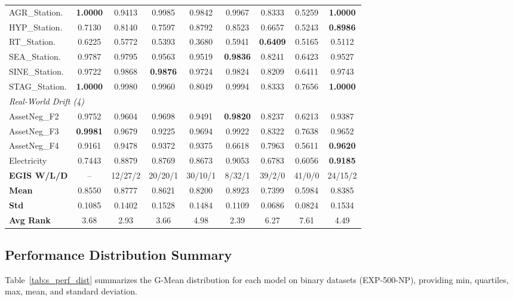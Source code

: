 \documentclass[lettersize,10pt]{article}
\begin{document}
\begin{longtable}{lcccccccc}
\midrule
AGR\_Station. & \textbf{1.0000} & 0.9413 & 0.9985 & 0.9842 & 0.9967 & 0.8333 & 0.5259 & \textbf{1.0000} \\
HYP\_Station. & 0.7130 & 0.8140 & 0.7597 & 0.8792 & 0.8523 & 0.6657 & 0.5243 & \textbf{0.8986} \\
RT\_Station. & 0.6225 & 0.5772 & 0.5393 & 0.3680 & 0.5941 & \textbf{0.6409} & 0.5165 & 0.5112 \\
SEA\_Station. & 0.9787 & 0.9795 & 0.9563 & 0.9519 & \textbf{0.9836} & 0.8241 & 0.6423 & 0.9527 \\
SINE\_Station. & 0.9722 & 0.9868 & \textbf{0.9876} & 0.9724 & 0.9824 & 0.8209 & 0.6411 & 0.9743 \\
STAG\_Station. & \textbf{1.0000} & 0.9980 & 0.9960 & 0.8049 & 0.9994 & 0.8333 & 0.7656 & \textbf{1.0000} \\
\midrule \multicolumn{9}{l}{\textit{Real-World Drift (4)}}\\
\midrule
AssetNeg\_F2 & 0.9752 & 0.9604 & 0.9698 & 0.9491 & \textbf{0.9820} & 0.8237 & 0.6213 & 0.9387 \\
AssetNeg\_F3 & \textbf{0.9981} & 0.9679 & 0.9225 & 0.9694 & 0.9922 & 0.8322 & 0.7638 & 0.9652 \\
AssetNeg\_F4 & 0.9161 & 0.9478 & 0.9372 & 0.9375 & 0.6618 & 0.7963 & 0.5611 & \textbf{0.9620} \\
Electricity & 0.7443 & 0.8879 & 0.8769 & 0.8673 & 0.9053 & 0.6783 & 0.6056 & \textbf{0.9185} \\
\midrule
\textbf{EGIS W/L/D} & -- & 12/27/2 & 20/20/1 & 30/10/1 & 8/32/1 & 39/2/0 & 41/0/0 & 24/15/2 \\
\textbf{Mean} & 0.8550 & 0.8777 & 0.8621 & 0.8200 & 0.8923 & 0.7399 & 0.5984 & 0.8385 \\
\textbf{Std} & 0.1085 & 0.1402 & 0.1528 & 0.1484 & 0.1109 & 0.0686 & 0.0824 & 0.1534 \\
\textbf{Avg Rank} & 3.68 & 2.93 & 3.66 & 4.98 & 2.39 & 6.27 & 7.61 & 4.49 \\
\bottomrule
\end{longtable}
\normalsize

\subsection{Performance Distribution Summary}
\label{sec:s2_distribution}
Table~\ref{tab:s_perf_dist} summarizes the G-Mean distribution for each model on binary datasets (EXP-500-NP), providing min, quartiles, max, mean, and standard deviation.
\end{document}
